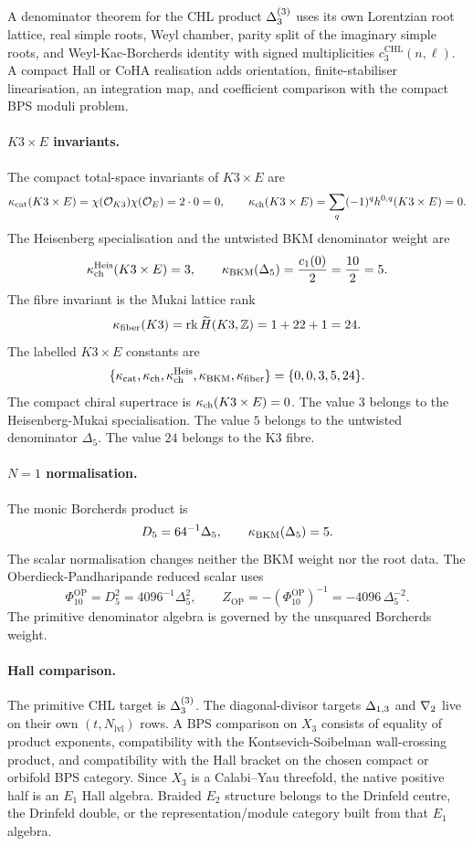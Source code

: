 A denominator theorem for the CHL product \(\Delta_{3}^{(3)}\) uses its
own Lorentzian root lattice, real simple roots, Weyl chamber, parity
split of the imaginary simple roots, and Weyl-Kac-Borcherds identity
with signed multiplicities \(c^{\mathrm{CHL}}_3(n,\ell)\).  A compact
Hall or CoHA realisation adds orientation, finite-stabiliser
linearisation, an integration map, and coefficient comparison with the
compact BPS moduli problem.

\paragraph{\(K3\times E\) invariants.}
The compact total-space invariants of \(K3\times E\) are
\[
  \kappa_{\mathrm{cat}}(K3\times E)
  =\chi(\mathcal{O}_{K3})\chi(\mathcal{O}_E)
  =2\cdot 0=0,
  \qquad
  \kappa_{\mathrm{ch}}(K3\times E)
  =
  \sum_q(-1)^qh^{0,q}(K3\times E)
  =0.
\]
The Heisenberg specialisation and the untwisted BKM denominator weight
are
\[
  \kappa_{\mathrm{ch}}^{\mathrm{Heis}}(K3\times E)=3,
  \qquad
  \kappa_{\mathrm{BKM}}(\Delta_5)=\frac{c_1(0)}{2}=\frac{10}{2}=5.
\]
The fibre invariant is the Mukai lattice rank
\[
  \kappa_{\mathrm{fiber}}(K3)=\operatorname{rk}\widetilde H(K3,\mathbb{Z})=1+22+1=24.
\]
The labelled \(K3\times E\) constants are
\[
  \{\kappa_{\mathrm{cat}},\kappa_{\mathrm{ch}},\kappa_{\mathrm{ch}}^{\mathrm{Heis}},\kappa_{\mathrm{BKM}},\kappa_{\mathrm{fiber}}\}
  =
  \{0,0,3,5,24\}.
\]
The compact chiral supertrace is \(\kappa_{\mathrm{ch}}(K3\times E)=0\).  The value
\(3\) belongs to the Heisenberg-Mukai specialisation.  The value \(5\)
belongs to the untwisted denominator \(\Delta_5\).  The value \(24\)
belongs to the K3 fibre.

\paragraph{\(N=1\) normalisation.}
The monic Borcherds product is
\[
  D_5=64^{-1}\Delta_5,
  \qquad
  \kappa_{\mathrm{BKM}}(\Delta_5)=5.
\]
The scalar normalisation changes neither the BKM weight nor the root
data.  The Oberdieck-Pandharipande reduced scalar uses
\[
  \Phi_{10}^{\mathrm{OP}}
  =
  D_5^2
  =
  4096^{-1}\Delta_5^2,
  \qquad
  Z_{\mathrm{OP}}
  =
  -(\Phi_{10}^{\mathrm{OP}})^{-1}
  =
  -4096\,\Delta_5^{-2}.
\]
The primitive denominator algebra is governed by the unsquared
Borcherds weight.

\paragraph{Hall comparison.}
The primitive CHL target is \(\Delta_{3}^{(3)}\).  The diagonal-divisor
targets \(\Delta_{1,3}\) and \(\nabla_{2}\) live on their own
\((t,N_{\mathrm{lvl}})\) rows.  A BPS comparison on \(X_3\) consists of
equality of product exponents, compatibility with the
Kontsevich-Soibelman wall-crossing product, and compatibility with the
Hall bracket on the chosen compact or orbifold BPS category.  Since
\(X_3\) is a Calabi--Yau threefold, the native positive half is an
\(E_1\) Hall algebra.  Braided \(E_2\) structure belongs to the
Drinfeld centre, the Drinfeld double, or the representation/module
category built from that \(E_1\) algebra.

